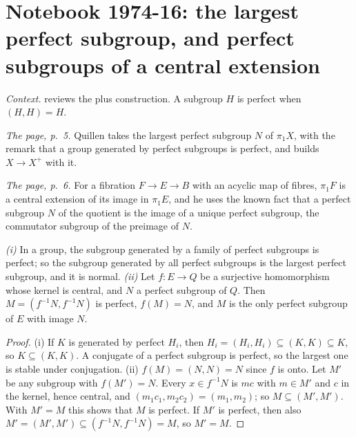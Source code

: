 \section[Notebook 1974-16: perfect subgroups]{Notebook 1974-16: the largest perfect subgroup, and perfect subgroups of a central extension\protect{}}\label{sec:quillen-1974-16}

\emph{Context.}  reviews the plus construction. A subgroup $H$ is perfect when $(H, H) = H$.

\emph{The page, p.~5.} Quillen takes the largest perfect subgroup $N$ of $\pi_1X$, with the remark that a group generated by perfect subgroups is perfect, and builds $X \to X^+$ with it.

\emph{The page, p.~6.} For a fibration $F \to E \to B$ with an acyclic map of fibres, $\pi_1F$ is a central extension of its image in $\pi_1E$, and he uses the known fact that a perfect subgroup $N$ of the quotient is the image of a unique perfect subgroup, the commutator subgroup of the preimage of $N$.

\begin{encadre}
\begin{theoreme}\label{thm:quillen-1974-16}
\emph{(i)} In a group, the subgroup generated by a family of perfect subgroups is perfect; so the subgroup generated by all perfect subgroups is the largest perfect subgroup, and it is normal. \emph{(ii)} Let $f \colon E \to Q$ be a surjective homomorphism whose kernel is central, and $N$ a perfect subgroup of $Q$. Then $M = (f^{-1}N, f^{-1}N)$ is perfect, $f(M) = N$, and $M$ is the only perfect subgroup of $E$ with image $N$.
\end{theoreme}
\end{encadre}

\begin{proof}
(i) If $K$ is generated by perfect $H_i$, then $H_i = (H_i, H_i) \subseteq (K, K) \subseteq K$, so $K \subseteq (K, K)$. A conjugate of a perfect subgroup is perfect, so the largest one is stable under conjugation. (ii) $f(M) = (N, N) = N$ since $f$ is onto. Let $M'$ be any subgroup with $f(M') = N$. Every $x \in f^{-1}N$ is $mc$ with $m \in M'$ and $c$ in the kernel, hence central, and $(m_1c_1, m_2c_2) = (m_1, m_2)$; so $M \subseteq (M', M')$. With $M' = M$ this shows that $M$ is perfect. If $M'$ is perfect, then also $M' = (M', M') \subseteq (f^{-1}N, f^{-1}N) = M$, so $M' = M$.
\end{proof}

